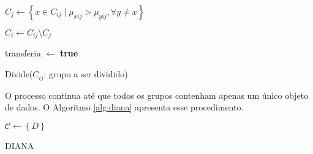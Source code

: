 \begin{function}[htbp]

	$ C_j \gets
		\left\{
			x \in C_{ij} \mid 
			\mu_{xij} > \mu_{yij},
			\forall y \neq x
		\right\}
	$ \;
	
	$C_i \gets C_{ij} \setminus C_j $ \;
	
	transferiu $\gets$ \textbf{true}\;
	
	
		
	
	\caption{Divide($C_{ij}$: grupo a ser dividido)}
	\label{func:divide}
\end{function}

O processo continua até que todos os grupos contenham apenas um único objeto 
de dados. O Algoritmo \ref{alg:diana} apresenta esse procedimento.

\begin{algorithm}[htbp]
	
	$\mathcal{C} \gets \left\{ D \right\}$
	
	
	\caption{DIANA}
	\label{alg:diana}
\end{algorithm}


